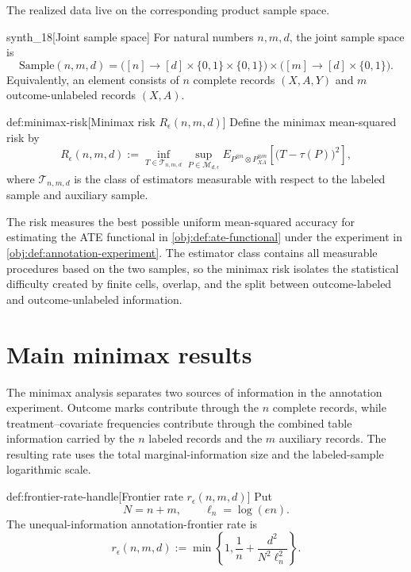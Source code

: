 \documentclass[11pt]{article}
\begin{document}
The realized data live on the corresponding product sample space.

\begin{definitionv}{synth_18}[Joint sample space]
For natural numbers \(n,m,d\), the joint sample space is
\[
\mathrm{Sample}(n,m,d)
=
\bigl([n]\to [d]\times\{0,1\}\times\{0,1\}\bigr)
\times
\bigl([m]\to [d]\times\{0,1\}\bigr).
\]
Equivalently, an element consists of \(n\) complete records \((X,A,Y)\) and \(m\) outcome-unlabeled records \((X,A)\).
\end{definitionv}

\begin{definitionv}{def:minimax-risk}[Minimax risk \(R_\epsilon(n,m,d)\)]
Define the minimax mean-squared risk by
\[
R_\epsilon(n,m,d)
:=
\inf_{T\in\mathcal T_{n,m,d}}
\sup_{P\in\mathcal M_{d,\epsilon}}
E_{P^{\otimes n}\otimes P_{XA}^{\otimes m}}
\!\left[\bigl(T-\tau(P)\bigr)^2\right],
\]
where \(\mathcal T_{n,m,d}\) is the class of estimators measurable with respect to the labeled sample and auxiliary sample.
\end{definitionv}

The risk  measures the best possible uniform mean-squared accuracy for estimating the ATE functional in \cref{obj:def:ate-functional} under the experiment in \cref{obj:def:annotation-experiment}. The estimator class  contains all measurable procedures based on the two samples, so the minimax risk isolates the statistical difficulty created by finite cells, overlap, and the split between outcome-labeled and outcome-unlabeled information.


\section{Main minimax results}\label{sec:main-results}

The minimax analysis separates two sources of information in the annotation experiment. Outcome marks contribute through the \(n\) complete records, while treatment--covariate frequencies contribute through the combined table information carried by the \(n\) labeled records and the \(m\) auxiliary records. The resulting rate uses the total marginal-information size  and the labeled-sample logarithmic scale.

\begin{definitionv}{def:frontier-rate-handle}[Frontier rate \(r_\epsilon(n,m,d)\)]
Put
\[
N=n+m,
\qquad
\ell_n=\log(en).
\]
The unequal-information annotation-frontier rate is
\[
r_\epsilon(n,m,d)
:=
\min\!\left\{
1,\frac1n+\frac{d^2}{N^2\ell_n^2}
\right\}.
\]
\end{definitionv}
\end{document}
